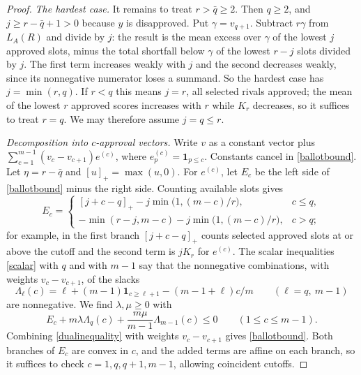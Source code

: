 \documentclass[11pt,a4paper]{article}
\theoremstyle{definition}
\theoremstyle{remark}
\newcommand{\one}{\mathbf 1}
\begin{document}
\begin{proof}
\emph{The hardest case.} It remains to treat $r>\bar q\ge2$. Then $q\ge2$, and $j\ge r-\bar q+1>0$ because $y$ is disapproved. Put $\gamma=v_{q+1}$. Subtract $r\gamma$ from $L_A(R)$ and divide by $j$: the result is the mean excess over $\gamma$ of the lowest $j$ approved slots, minus the total shortfall below $\gamma$ of the lowest $r-j$ slots divided by $j$. The first term increases weakly with $j$ and the second decreases weakly, since its nonnegative numerator loses a summand. So the hardest case has $j=\min(r,q)$. If $r<q$ this means $j=r$, all selected rivals approved; the mean of the lowest $r$ approved scores increases with $r$ while $K_r$ decreases, so it suffices to treat $r=q$. We may therefore assume $j=q\le r$.

\emph{Decomposition into $c$-approval vectors.} Write $v$ as a constant vector plus $\sum_{c=1}^{m-1}(v_c-v_{c+1})e^{(c)}$, where $e^{(c)}_p=\one_{p\le c}$. Constants cancel in \eqref{ballotbound}. Let $\eta=r-\bar q$ and $[u]_+=\max(u,0)$. For $e^{(c)}$, let $E_c$ be the left side of \eqref{ballotbound} minus the right side. Counting available slots gives
\[
E_c=\begin{cases}
 [j+c-q]_+-j\min\bigl(1,(m-c)/r\bigr),& c\le q,\\[2pt]
 -\min(r-j,m-c)-j\min\bigl(1,(m-c)/r\bigr),& c>q ;
\end{cases}
\]
for example, in the first branch $[j+c-q]_+$ counts selected approved slots at or above the cutoff and the second term is $jK_r$ for $e^{(c)}$. The scalar inequalities \eqref{scalar} with $q$ and with $m-1$ say that the nonnegative combinations, with weights $v_c-v_{c+1}$, of the slacks
\[
 \Lambda_\ell(c)=\ell+(m-1)\one_{c\ge\ell+1}-(m-1+\ell)c/m\qquad(\ell=q,\ m-1)
\]
are nonnegative. We find $\lambda,\mu\ge0$ with
\begin{equation}
 E_c+m\lambda\Lambda_q(c)+\frac{m\mu}{m-1}\Lambda_{m-1}(c)\le0\qquad(1\le c\le m-1).\label{dualinequality}
\end{equation}
Combining \eqref{dualinequality} with weights $v_c-v_{c+1}$ gives \eqref{ballotbound}. Both branches of $E_c$ are convex in $c$, and the added terms are affine on each branch, so it suffices to check $c=1,q,q+1,m-1$, allowing coincident cutoffs.


\end{proof}
\end{document}
